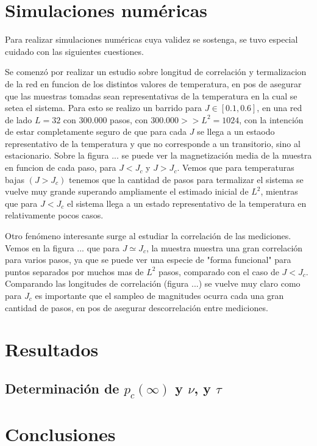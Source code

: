 \documentclass[%
 reprint,
 amsmath,amssymb,
 aps,
]{revtex4-1}
\begin{document}
\section{\label{simulations}Simulaciones num\'ericas}

Para realizar simulaciones num\'ericas cuya validez se sostenga, se tuvo
especial cuidado con las siguientes cuestiones.

Se comenz\'o por realizar un estudio sobre longitud de correlaci\'on y
termalizacion de la red en funcion de los distintos valores de temperatura, en
pos de asegurar que las muestras tomadas sean representativas de la temperatura
en la cual se setea el sistema. Para esto se realizo un barrido para $J \in
[0.1, 0.6]$, en una red de lado $L = 32$ con $300.000$ pasos,
con $300.000 >> L^2 = 1024$, con la intenci\'on de estar completamente seguro
de que para cada $J$ se llega a un estaodo representativo de la temperatura y
que no corresponde a un transitorio, sino al estacionario. Sobre la figura ...
se puede ver la magnetizaci\'on media de la muestra en funcion de cada paso,
para $J < J_c$ y $J > J_c$. Vemos que para temperaturas bajas $(J > J_c)$
tenemos que la cantidad de pasos para termalizar el sistema se vuelve muy
grande superando ampliamente el estimado inicial de $L^2$, mientras que para
$J < J_c$ el sistema llega a un estado representativo de la temperatura en
relativamente pocos casos.

Otro fen\'omeno interesante surge al estudiar la correlaci\'on de las
mediciones. Vemos en la figura ... que para $J \simeq J_c$, la muestra muestra
una gran correlaci\'on para varios pasos, ya que se puede ver una especie de
"forma funcional" para puntos separados por muchos mas de $L^2$ pasos,
comparado con el caso de $J < J_c$. Comparando las longitudes de correlaci\'on
(figura ...) se vuelve muy claro como para $J_c$ es importante que el sampleo
de magnitudes ocurra cada una gran cantidad de pasos, en pos de asegurar
descorrelaci\'on entre mediciones.

\section{\label{results}Resultados}

\subsection{\label{p_c} Determinaci\'on de $p_c(\infty)$ y $\nu$, y $\tau$}

\section{\label{conclusions}Conclusiones}



\appendix
\end{document}
